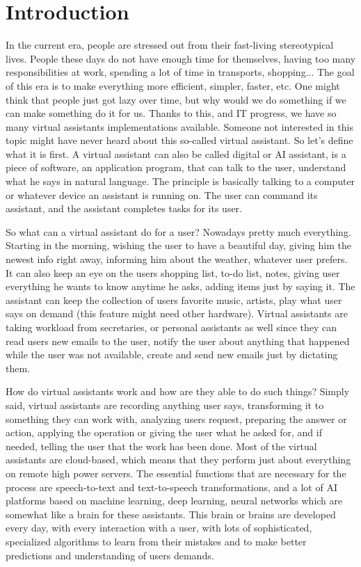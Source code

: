 \documentclass[
  digital, %
  oneside, %
  table,   %
  lof,     %
  lot,     %
]{fithesis3}
\begin{document}
\chapter*{Introduction}
In the current era, people are stressed out from their fast-living stereotypical lives. People these days do not have enough time for themselves, having too many responsibilities at work, spending a lot of time in transports, shopping... The goal of this era is to make everything more efficient, simpler, faster, etc. One might think that people just got lazy over time, but why would we do something if we can make something do it for us. Thanks to this, and IT progress, we have so many virtual assistants implementations available. Someone not interested in this topic might have never heard about this so-called virtual assistant. So let's define what it is first. A virtual assistant can also be called digital or AI assistant, is a piece of software, an application program, that can talk to the user, understand what he says in natural language. The principle is basically talking to a computer or whatever device an assistant is running on. The user can command its assistant, and the assistant completes tasks for its user.

So what can a virtual assistant do for a user? Nowadays pretty much everything. Starting in the morning, wishing the user to have a beautiful day, giving him the newest info right away, informing him about the weather, whatever user prefers. It can also keep an eye on the users shopping list, to-do list, notes, giving user everything he wants to know anytime he asks, adding items just by saying it. The assistant can keep the collection of users favorite music, artists, play what user says on demand (this feature might need other hardware). Virtual assistants are taking workload from secretaries, or personal assistants as well since they can read users new emails to the user, notify the user about anything that happened while the user was not available, create and send new emails just by dictating them.

How do virtual assistants work and how are they able to do such things? Simply said, virtual assistants are recording anything user says, transforming it to something they can work with, analyzing users request, preparing the answer or action, applying the operation or giving the user what he asked for, and if needed, telling the user that the work has been done. Most of the virtual assistants are cloud-based, which means that they perform just about everything on remote high power servers. The essential functions that are necessary for the process are speech-to-text and text-to-speech transformations, and a lot of AI platforms based on machine learning, deep learning, neural networks which are somewhat like a brain for these assistants. This brain or brains are developed every day, with every interaction with a user, with lots of sophisticated, specialized algorithms to learn from their mistakes and to make better predictions and understanding of users demands.
\end{document}
